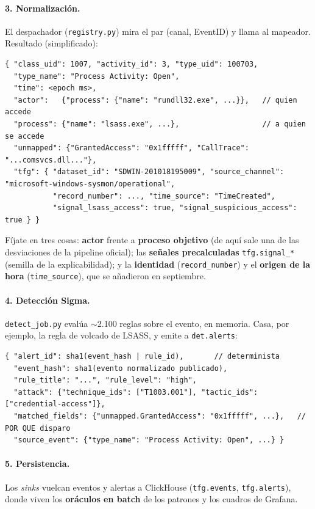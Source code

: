 \documentclass[11pt,a4paper]{article}
\newcommand{\cod}[1]{\texttt{#1}}
\begin{document}
\paragraph{3. Normalización.} El despachador (\cod{registry.py}) mira el par (canal, EventID) y llama
al mapeador. Resultado (simplificado):

\begin{lstlisting}
{ "class_uid": 1007, "activity_id": 3, "type_uid": 100703,
  "type_name": "Process Activity: Open",
  "time": <epoch ms>,
  "actor":   {"process": {"name": "rundll32.exe", ...}},   // quien accede
  "process": {"name": "lsass.exe", ...},                   // a quien se accede
  "unmapped": {"GrantedAccess": "0x1fffff", "CallTrace": "...comsvcs.dll..."},
  "tfg": { "dataset_id": "SDWIN-201018195009", "source_channel": "microsoft-windows-sysmon/operational",
           "record_number": ..., "time_source": "TimeCreated",
           "signal_lsass_access": true, "signal_suspicious_access": true } }
\end{lstlisting}

Fíjate en tres cosas: \textbf{actor} frente a \textbf{proceso objetivo} (de aquí sale una de las
desviaciones de la pipeline oficial); las \textbf{señales precalculadas} \cod{tfg.signal\_*} (semilla de la
explicabilidad); y la \textbf{identidad} (\cod{record\_number}) y el \textbf{origen de la hora}
(\cod{time\_source}), que se añadieron en septiembre.

\paragraph{4. Detección Sigma.} \cod{detect\_job.py} evalúa $\sim$2.100 reglas sobre el evento, en memoria.
Casa, por ejemplo, la regla de volcado de LSASS, y emite a \cod{det.alerts}:

\begin{lstlisting}
{ "alert_id": sha1(event_hash | rule_id),       // determinista
  "event_hash": sha1(evento normalizado publicado),
  "rule_title": "...", "rule_level": "high",
  "attack": {"technique_ids": ["T1003.001"], "tactic_ids": ["credential-access"]},
  "matched_fields": {"unmapped.GrantedAccess": "0x1fffff", ...},   // POR QUE disparo
  "source_event": {"type_name": "Process Activity: Open", ...} }
\end{lstlisting}

\paragraph{5. Persistencia.} Los \textit{sinks} vuelcan eventos y alertas a ClickHouse (\cod{tfg.events},
\cod{tfg.alerts}), donde viven los \textbf{oráculos en batch} de los patrones y los cuadros de Grafana.
\end{document}
